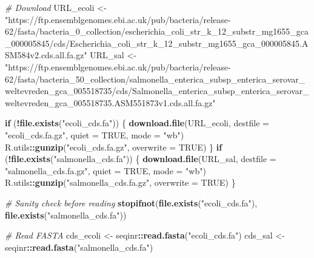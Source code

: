 \documentclass[
]{article}
\newenvironment{Shaded}{\begin{snugshade}}{\end{snugshade}}
\newcommand{\AttributeTok}[1]{\textcolor[rgb]{0.13,0.29,0.53}{#1}}
\newcommand{\CommentTok}[1]{\textcolor[rgb]{0.56,0.35,0.01}{\textit{#1}}}
\newcommand{\ConstantTok}[1]{\textcolor[rgb]{0.56,0.35,0.01}{#1}}
\newcommand{\ControlFlowTok}[1]{\textcolor[rgb]{0.13,0.29,0.53}{\textbf{#1}}}
\newcommand{\FunctionTok}[1]{\textcolor[rgb]{0.13,0.29,0.53}{\textbf{#1}}}
\newcommand{\NormalTok}[1]{#1}
\newcommand{\OtherTok}[1]{\textcolor[rgb]{0.56,0.35,0.01}{#1}}
\newcommand{\SpecialCharTok}[1]{\textcolor[rgb]{0.81,0.36,0.00}{\textbf{#1}}}
\newcommand{\StringTok}[1]{\textcolor[rgb]{0.31,0.60,0.02}{#1}}
\begin{document}
\begin{Shaded}
\begin{Highlighting}[]
\CommentTok{\# Download }
\NormalTok{URL\_ecoli }\OtherTok{\textless{}{-}} \StringTok{"https://ftp.ensemblgenomes.ebi.ac.uk/pub/bacteria/release{-}62/fasta/bacteria\_0\_collection/escherichia\_coli\_str\_k\_12\_substr\_mg1655\_gca\_000005845/cds/Escherichia\_coli\_str\_k\_12\_substr\_mg1655\_gca\_000005845.ASM584v2.cds.all.fa.gz"}
\NormalTok{URL\_sal   }\OtherTok{\textless{}{-}} \StringTok{"https://ftp.ensemblgenomes.ebi.ac.uk/pub/bacteria/release{-}62/fasta/bacteria\_50\_collection/salmonella\_enterica\_subsp\_enterica\_serovar\_weltevreden\_gca\_005518735/cds/Salmonella\_enterica\_subsp\_enterica\_serovar\_weltevreden\_gca\_005518735.ASM551873v1.cds.all.fa.gz"}

\ControlFlowTok{if}\NormalTok{ (}\SpecialCharTok{!}\FunctionTok{file.exists}\NormalTok{(}\StringTok{"ecoli\_cds.fa"}\NormalTok{)) \{}
  \FunctionTok{download.file}\NormalTok{(URL\_ecoli, }\AttributeTok{destfile =} \StringTok{"ecoli\_cds.fa.gz"}\NormalTok{, }\AttributeTok{quiet =} \ConstantTok{TRUE}\NormalTok{, }\AttributeTok{mode =} \StringTok{"wb"}\NormalTok{)}
\NormalTok{  R.utils}\SpecialCharTok{::}\FunctionTok{gunzip}\NormalTok{(}\StringTok{"ecoli\_cds.fa.gz"}\NormalTok{, }\AttributeTok{overwrite =} \ConstantTok{TRUE}\NormalTok{)}
\NormalTok{\}}
\ControlFlowTok{if}\NormalTok{ (}\SpecialCharTok{!}\FunctionTok{file.exists}\NormalTok{(}\StringTok{"salmonella\_cds.fa"}\NormalTok{)) \{}
  \FunctionTok{download.file}\NormalTok{(URL\_sal,  }\AttributeTok{destfile =} \StringTok{"salmonella\_cds.fa.gz"}\NormalTok{, }\AttributeTok{quiet =} \ConstantTok{TRUE}\NormalTok{, }\AttributeTok{mode =} \StringTok{"wb"}\NormalTok{)}
\NormalTok{  R.utils}\SpecialCharTok{::}\FunctionTok{gunzip}\NormalTok{(}\StringTok{"salmonella\_cds.fa.gz"}\NormalTok{, }\AttributeTok{overwrite =} \ConstantTok{TRUE}\NormalTok{)}
\NormalTok{\}}

\CommentTok{\# Sanity check before reading}
\FunctionTok{stopifnot}\NormalTok{(}\FunctionTok{file.exists}\NormalTok{(}\StringTok{"ecoli\_cds.fa"}\NormalTok{), }\FunctionTok{file.exists}\NormalTok{(}\StringTok{"salmonella\_cds.fa"}\NormalTok{))}

\CommentTok{\# Read FASTA}
\NormalTok{cds\_ecoli }\OtherTok{\textless{}{-}}\NormalTok{ seqinr}\SpecialCharTok{::}\FunctionTok{read.fasta}\NormalTok{(}\StringTok{"ecoli\_cds.fa"}\NormalTok{)}
\NormalTok{cds\_sal   }\OtherTok{\textless{}{-}}\NormalTok{ seqinr}\SpecialCharTok{::}\FunctionTok{read.fasta}\NormalTok{(}\StringTok{"salmonella\_cds.fa"}\NormalTok{)}
\end{Highlighting}
\end{Shaded}
\end{document}
